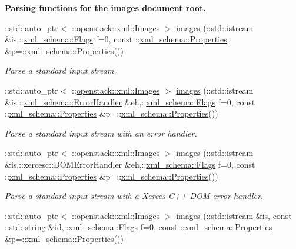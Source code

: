 \begin{Indent}{\bf Parsing functions for the images document root.}
\begin{DoxyCompactItemize}
::std::auto\_\-ptr$<$ ::\hyperlink{classopenstack_1_1xml_1_1Images}{openstack::xml::Images} $>$ \hyperlink{namespaceopenstack_1_1xml_ae8709e9823acb52b26bf83777b485151}{images} (::std::istream \&is,::\hyperlink{namespacexml__schema_affb4c227cbd9aa7453dd1dc5a1401943}{xml\_\-schema::Flags} f=0, const ::\hyperlink{namespacexml__schema_ad27ce19a7ee1d3b1064092648898f64c}{xml\_\-schema::Properties} \&p=::\hyperlink{namespacexml__schema_ad27ce19a7ee1d3b1064092648898f64c}{xml\_\-schema::Properties}())
\begin{DoxyCompactList}\small\item\em Parse a standard input stream. \item\end{DoxyCompactList}\item 
::std::auto\_\-ptr$<$ ::\hyperlink{classopenstack_1_1xml_1_1Images}{openstack::xml::Images} $>$ \hyperlink{namespaceopenstack_1_1xml_a8d630db427d7a3011ec35d22b9153c9b}{images} (::std::istream \&is,::\hyperlink{namespacexml__schema_ab1c9361bfd3b404eaabf0c31eded79dc}{xml\_\-schema::ErrorHandler} \&eh,::\hyperlink{namespacexml__schema_affb4c227cbd9aa7453dd1dc5a1401943}{xml\_\-schema::Flags} f=0, const ::\hyperlink{namespacexml__schema_ad27ce19a7ee1d3b1064092648898f64c}{xml\_\-schema::Properties} \&p=::\hyperlink{namespacexml__schema_ad27ce19a7ee1d3b1064092648898f64c}{xml\_\-schema::Properties}())
\begin{DoxyCompactList}\small\item\em Parse a standard input stream with an error handler. \item\end{DoxyCompactList}\item 
::std::auto\_\-ptr$<$ ::\hyperlink{classopenstack_1_1xml_1_1Images}{openstack::xml::Images} $>$ \hyperlink{namespaceopenstack_1_1xml_afe8f05bd6197cec8c1311091d4d4c911}{images} (::std::istream \&is,::xercesc::DOMErrorHandler \&eh,::\hyperlink{namespacexml__schema_affb4c227cbd9aa7453dd1dc5a1401943}{xml\_\-schema::Flags} f=0, const ::\hyperlink{namespacexml__schema_ad27ce19a7ee1d3b1064092648898f64c}{xml\_\-schema::Properties} \&p=::\hyperlink{namespacexml__schema_ad27ce19a7ee1d3b1064092648898f64c}{xml\_\-schema::Properties}())
\begin{DoxyCompactList}\small\item\em Parse a standard input stream with a Xerces-\/C++ DOM error handler. \item\end{DoxyCompactList}\item 
::std::auto\_\-ptr$<$ ::\hyperlink{classopenstack_1_1xml_1_1Images}{openstack::xml::Images} $>$ \hyperlink{namespaceopenstack_1_1xml_af0a02e3eaaa7d05f96f3ecee43284c8f}{images} (::std::istream \&is, const ::std::string \&id,::\hyperlink{namespacexml__schema_affb4c227cbd9aa7453dd1dc5a1401943}{xml\_\-schema::Flags} f=0, const ::\hyperlink{namespacexml__schema_ad27ce19a7ee1d3b1064092648898f64c}{xml\_\-schema::Properties} \&p=::\hyperlink{namespacexml__schema_ad27ce19a7ee1d3b1064092648898f64c}{xml\_\-schema::Properties}())

\end{DoxyCompactItemize}
\end{Indent}
